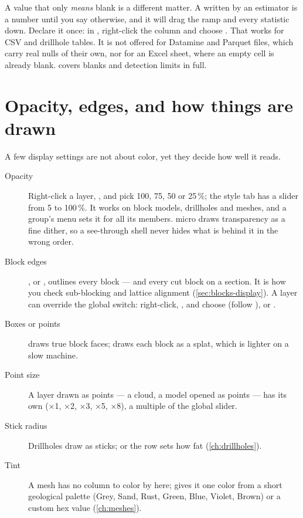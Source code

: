 A value that only \emph{means} blank is a different matter. A  written by an estimator is a number until you say otherwise, and it will drag the ramp and every statistic down. Declare it once: in , right-click the column and choose . That works for CSV and drillhole tables. It is not offered for Datamine and Parquet files, which carry real nulls of their own, nor for an Excel sheet, where an empty cell is already blank.  covers blanks and detection limits in full.

\section{Opacity, edges, and how things are drawn}\label{sec:color-draw}
A few display settings are not about color, yet they decide how well it reads.

\begin{description}
\item[Opacity] Right-click a layer, , and pick 100, 75, 50 or 25\,\%; the style tab has a slider from 5 to 100\,\%. It works on block models, drillholes and meshes, and a group's menu sets it for all its members. micro draws transparency as a fine dither, so a see-through shell never hides what is behind it in the wrong order.
\item[Block edges] , or , outlines every block — and every cut block on a section. It is how you check sub-blocking and lattice alignment (\cref{sec:blocks-display}). A layer can override the global switch: right-click, , and choose  (follow ),  or .
\item[Boxes or points]  draws true block faces;  draws each block as a splat, which is lighter on a slow machine.
\item[Point size] A layer drawn as points — a cloud, a model opened as points — has its own  (×1, ×2, ×3, ×5, ×8), a multiple of the global  slider.
\item[Stick radius] Drillholes draw as sticks;  or the  row sets how fat (\cref{ch:drillholes}).
\item[Tint] A mesh has no column to color by here;  gives it one color from a short geological palette (Grey, Sand, Rust, Green, Blue, Violet, Brown) or a custom hex value (\cref{ch:meshes}).
\end{description}

